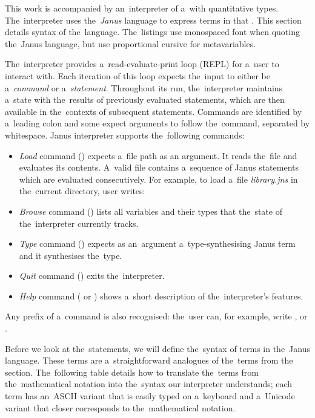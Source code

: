 
This work is accompanied by an~interpreter of a~\lc with quantitative types.
The~interpreter uses the~\emph{Janus} language to express terms in that \lc.
This section details syntax of the~language. The~listings use monospaced font
when quoting the~Janus language, but use proportional cursive for metavariables.

The~interpreter provides a~read-evaluate-print loop (REPL) for a~user to
interact with. Each iteration of this loop expects the~input to either be
a~\emph{command} or a~\emph{statement}. Throughout its run, the~interpreter
maintains a~state with the~results of previously evaluated statements, which are
then available in the~contexts of subsequent statements. Commands are identified
by a~leading colon and some expect arguments to follow the~command, separated by
whitespace. Janus interpreter supports the~following commands:
\begin{itemize}
  \item \emph{Load} command () expects a~file path as an argument.
    It reads the~file and evaluates its contents. A~valid file contains
    a~sequence of Janus statements which are evaluated consecutively. For
    example, to load a~file \emph{library.jns} in the~current directory, user
    writes:
    \begin{center}
    \end{center}
  \item \emph{Browse} command () lists all variables and their
    types that the~state of the~interpreter currently tracks.
  \item \emph{Type} command () expects as an~argument
    a~type-synthesising Janus term and it synthesises the~type.
  \item \emph{Quit} command () exits the~interpreter.
  \item \emph{Help} command ( or ) shows a~short
    description of the~interpreter's features.
\end{itemize}
Any prefix of a~command is also recognised: the~user can, for example, write
, or .

Before we look at the~statements, we will define the~syntax of terms in
the~Janus language. These terms are a~straightforward analogues of
the~terms from the~ section. The~following table
details how to translate the~terms from the~mathematical notation into
the~syntax our interpreter understands; each term has an~ASCII variant that
is easily typed on a~keyboard and a~Unicode variant that closer corresponds to
the~mathematical notation.

